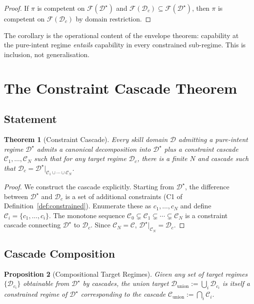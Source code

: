 \documentclass[11pt,twocolumn,a4paper]{article}
\newtheorem{theorem}{Theorem}[section]
\newtheorem{proposition}[theorem]{Proposition}
\newcommand{\cF}{\mathcal{F}}
\newcommand{\cD}{\mathcal{D}}
\newcommand{\cC}{\mathcal{C}}
\begin{document}
\begin{proof}
If $\pi$ is competent on $\cF(\cD^\star)$ and $\cF(\cD_c) \subseteq \cF(\cD^\star)$, then $\pi$ is competent on $\cF(\cD_c)$ by domain restriction.
\end{proof}

The corollary is the operational content of the envelope theorem: capability at the pure-intent regime \emph{entails} capability in every constrained sub-regime. This is inclusion, not generalisation.


\section{The Constraint Cascade Theorem}
\label{sec:cascade}

\subsection{Statement}

\begin{theorem}[Constraint Cascade]
\label{thm:cascade}
Every skill domain $\cD$ admitting a pure-intent regime $\cD^\star$ admits a canonical decomposition into $\cD^\star$ plus a constraint cascade $\cC_1, \ldots, \cC_N$ such that for any target regime $\cD_c$, there is a finite $N$ and cascade such that $\cD_c = \cD^\star |_{\cC_1 \cup \cdots \cup \cC_N}$.
\end{theorem}

\begin{proof}
We construct the cascade explicitly. Starting from $\cD^\star$, the difference between $\cD^\star$ and $\cD_c$ is a set of additional constraints (C1 of Definition~\ref{def:constrained}). Enumerate these as $c_1, \ldots, c_N$ and define $\cC_i = \{c_1, \ldots, c_i\}$. The monotone sequence $\cC_0 \subsetneq \cC_1 \subsetneq \cdots \subsetneq \cC_N$ is a constraint cascade connecting $\cD^\star$ to $\cD_c$. Since $\cC_N = \cC$, $\cD^\star|_{\cC_N} = \cD_c$.
\end{proof}

\subsection{Cascade Composition}

\begin{proposition}[Compositional Target Regimes]
\label{prop:composition}
Given any set of target regimes $\{\cD_{c_i}\}$ obtainable from $\cD^\star$ by cascades, the \emph{union target} $\cD_{\text{union}} := \bigcup_i \cD_{c_i}$ is itself a constrained regime of $\cD^\star$ corresponding to the cascade $\cC_{\text{union}} := \bigcap_i \cC_i$.
\end{proposition}
\end{document}
